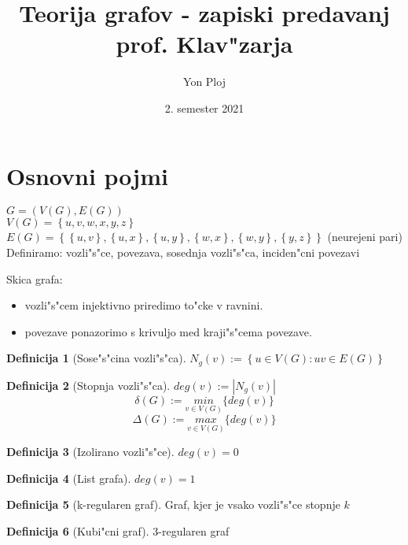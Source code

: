\documentclass{article}
\theoremstyle{definition}
\newtheorem{definition}{Definicija}[section]
\begin{document}
	
	\title{Teorija grafov - zapiski predavanj prof. Klav"zarja}
	\author{Yon Ploj}
	\date{2. semester 2021}
	\maketitle
	
	
	\section{Osnovni pojmi}
	$ G = (V(G), E(G)) $ \\ 
	$ V(G) = \left\lbrace u, v, w, x, y, z\right\rbrace $ \\ 
	$ E(G) = \left\lbrace\left\lbrace u,v\right\rbrace, \left\lbrace u,x\right\rbrace, \left\lbrace u,y\right\rbrace, \left\lbrace w,x\right\rbrace, \left\lbrace w,y\right\rbrace, \left\lbrace y,z\right\rbrace\right\rbrace $ (neurejeni pari) \\ 
	Definiramo: vozli"s"ce, povezava, sosednja vozli"s"ca, inciden"cni povezavi
	
	Skica grafa:
	\begin{itemize}
		\item vozli"s"cem injektivno priredimo to"cke v ravnini.
		\item povezave ponazorimo s krivuljo med kraji"s"cema povezave.
	\end{itemize}
	
	\begin{definition}[Sose"s"cina vozli"s"ca]
		$N_g(v) := \left\lbrace u \in V(G): uv \in E(G)\right\rbrace$ %
	\end{definition}
	\begin{definition}[Stopnja vozli"s"ca]
		$deg(v) := |N_g(v)|$
		$$\delta(G) := \underset{v \in V(G)}{min} \lbrace deg(v) \rbrace $$
		$$\Delta(G) := \underset{v \in V(G)}{max} \lbrace deg(v) \rbrace $$		
	\end{definition}
	\begin{definition}[Izolirano vozli"s"ce]
		$deg(v) = 0$
	\end{definition}
	\begin{definition}[List grafa]
		$deg(v) = 1$
	\end{definition}
	\begin{definition} [k-regularen graf]
		Graf, kjer je vsako vozli"s"ce stopnje $k$
	\end{definition}
	\begin{definition} [Kubi"cni graf]
		3-regularen graf
	\end{definition}	
	
\end{document}
